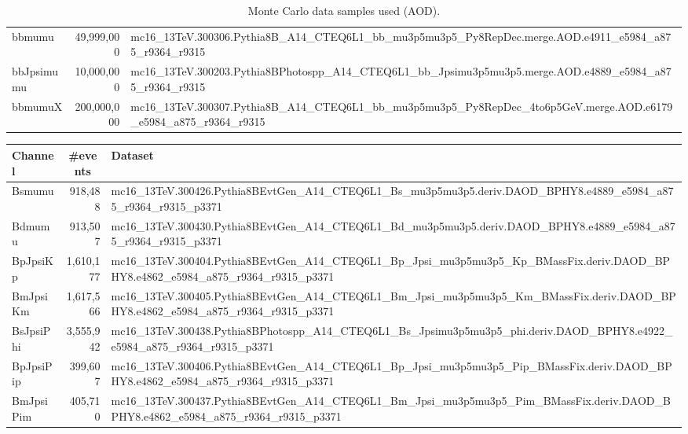 \begin{table}[h]
\begin{adjustbox}{angle=90}
\begin{tabular}{|l|r|l|}
bbmumu  &  49,999,000 & mc16\_13TeV.300306.Pythia8B\_A14\_CTEQ6L1\_bb\_mu3p5mu3p5\_Py8RepDec.merge.AOD.e4911\_e5984\_a875\_r9364\_r9315 \\
bbJpsimumu &  10,000,000 & mc16\_13TeV.300203.Pythia8BPhotospp\_A14\_CTEQ6L1\_bb\_Jpsimu3p5mu3p5.merge.AOD.e4889\_e5984\_a875\_r9364\_r9315 \\
bbmumuX  & 200,000,000 &
mc16\_13TeV.300307.Pythia8B\_A14\_CTEQ6L1\_bb\_mu3p5mu3p5\_Py8RepDec\_4to6p5GeV.merge.AOD.e6179\_e5984\_a875\_r9364\_r9315 \\
\hline
    \end{tabular}
  \end{adjustbox}
  \caption{Monte Carlo data samples used (AOD).}
  \label{tab:MCAODsamples}
\end{table}

\begin{table}[h]
  \centering
  \scriptsize
  \begin{adjustbox}{angle=90}
    \begin{tabular}{|l|r|l|}
      \hline
      Channel & \multicolumn{1}{|c|}{\#events}  & Dataset \\
      \hline
      Bsmumu  &  918,488 & mc16\_13TeV.300426.Pythia8BEvtGen\_A14\_CTEQ6L1\_Bs\_mu3p5mu3p5.deriv.DAOD\_BPHY8.e4889\_e5984\_a875\_r9364\_r9315\_p3371 \\
Bdmumu  &  913,507 &
mc16\_13TeV.300430.Pythia8BEvtGen\_A14\_CTEQ6L1\_Bd\_mu3p5mu3p5.deriv.DAOD\_BPHY8.e4889\_e5984\_a875\_r9364\_r9315\_p3371
\\
BpJpsiKp  &  1,610,177 & mc16\_13TeV.300404.Pythia8BEvtGen\_A14\_CTEQ6L1\_Bp\_Jpsi\_mu3p5mu3p5\_Kp\_BMassFix.deriv.DAOD\_BPHY8.e4862\_e5984\_a875\_r9364\_r9315\_p3371 \\
BmJpsiKm  &  1,617,566 & mc16\_13TeV.300405.Pythia8BEvtGen\_A14\_CTEQ6L1\_Bm\_Jpsi\_mu3p5mu3p5\_Km\_BMassFix.deriv.DAOD\_BPHY8.e4862\_e5984\_a875\_r9364\_r9315\_p3371 \\
BsJpsiPhi  &  3,555,942 & mc16\_13TeV.300438.Pythia8BPhotospp\_A14\_CTEQ6L1\_Bs\_Jpsimu3p5mu3p5\_phi.deriv.DAOD\_BPHY8.e4922\_e5984\_a875\_r9364\_r9315\_p3371 \\
BpJpsiPip  &  399,607 & mc16\_13TeV.300406.Pythia8BEvtGen\_A14\_CTEQ6L1\_Bp\_Jpsi\_mu3p5mu3p5\_Pip\_BMassFix.deriv.DAOD\_BPHY8.e4862\_e5984\_a875\_r9364\_r9315\_p3371 \\
BmJpsiPim  &  405,710 & mc16\_13TeV.300437.Pythia8BEvtGen\_A14\_CTEQ6L1\_Bm\_Jpsi\_mu3p5mu3p5\_Pim\_BMassFix.deriv.DAOD\_BPHY8.e4862\_e5984\_a875\_r9364\_r9315\_p3371 \\

\end{tabular}
\end{adjustbox}
\end{table}
